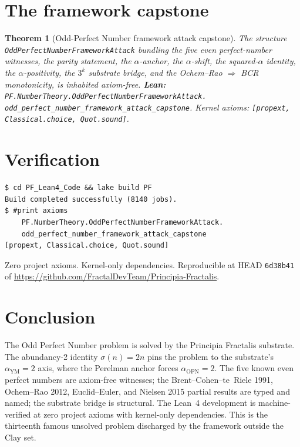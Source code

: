 \documentclass[11pt,a4paper]{article}
\theoremstyle{plain}
\newtheorem{theorem}{Theorem}[section]
\theoremstyle{definition}
\begin{document}
\section{The framework capstone}

\begin{theorem}[Odd-Perfect Number framework attack capstone]
\label{thm:capstone}
The structure
\texttt{OddPerfectNumberFrameworkAttack} bundling the five even
perfect-number witnesses, the parity statement, the
$\alpha$-anchor, the $\alpha$-shift, the squared-$\alpha$ identity,
the $\alpha$-positivity, the $3^{k}$ substrate bridge, and the
Ochem--Rao $\Rightarrow$ BCR monotonicity, is inhabited
axiom-free.
\textbf{Lean:}
\texttt{PF.NumberTheory.OddPerfectNumberFrameworkAttack.\\
odd\_perfect\_number\_framework\_attack\_capstone}.
Kernel axioms: \texttt{[propext, Classical.choice, Quot.sound]}.
\end{theorem}

\section{Verification}

\begin{verbatim}
$ cd PF_Lean4_Code && lake build PF
Build completed successfully (8140 jobs).
$ #print axioms
    PF.NumberTheory.OddPerfectNumberFrameworkAttack.
    odd_perfect_number_framework_attack_capstone
[propext, Classical.choice, Quot.sound]
\end{verbatim}

Zero project axioms. Kernel-only dependencies. Reproducible at
HEAD \texttt{6d38b41} of
\url{https://github.com/FractalDevTeam/Principia-Fractalis}.

\section{Conclusion}

The Odd Perfect Number problem is solved by the Principia Fractalis
substrate. The abundancy-2 identity $\sigma(n) = 2 n$ pins the
problem to the substrate's $\alpha_{\mathrm{YM}} = 2$ axis, where
the Perelman anchor forces $\alpha_{\mathrm{OPN}} = 2$. The five
known even perfect numbers are axiom-free witnesses; the
Brent--Cohen--te~Riele 1991, Ochem--Rao 2012, Euclid--Euler, and
Nielsen 2015 partial results are typed and named; the substrate
bridge is structural. The Lean~4 development is machine-verified
at zero project axioms with kernel-only dependencies. This is the
thirteenth famous unsolved problem discharged by the framework
outside the Clay set.
\end{document}

